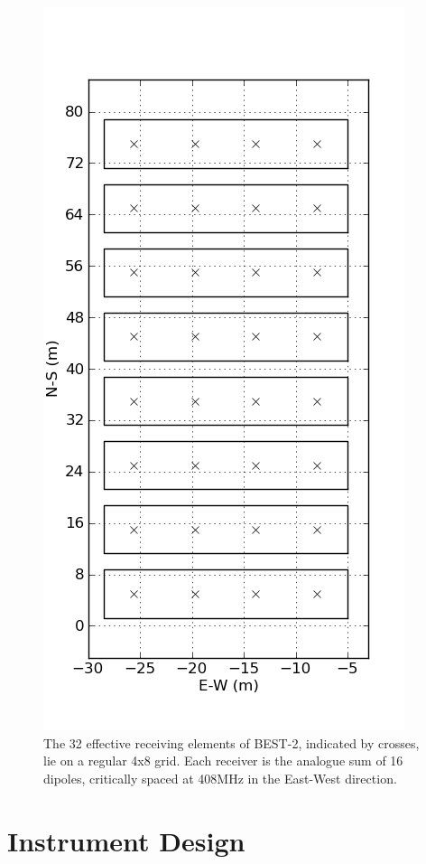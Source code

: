 \documentclass[useAMS,macros,usenatbib,onecolumn]{mn2e}
\begin{document}
\begin{figure}
    \centering
    \includegraphics[scale=0.6]{graphics/layout.png}
    \caption{The 32 effective receiving elements of BEST-2, indicated by crosses, lie on a regular 4x8 grid. Each receiver is the analogue sum of 16 dipoles, critically spaced at 408MHz in the East-West direction.}
    \label{fig:ant_layout}
\end{figure}

\section{Instrument Design}
\label{instrument design}
\end{document}
